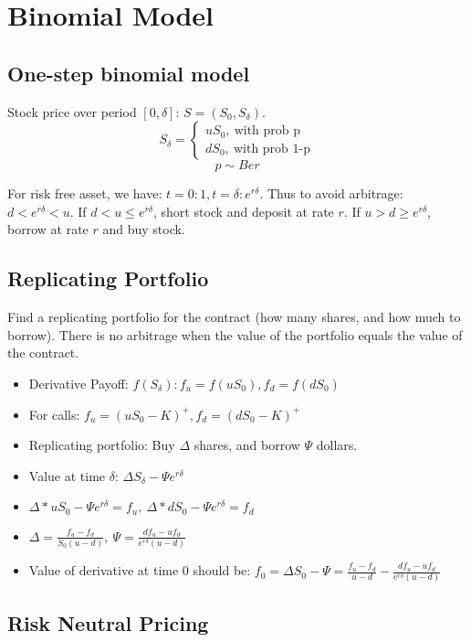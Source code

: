 \documentclass{article}
\begin{document}
\section*{Binomial Model}

\subsection*{One-step binomial model}

Stock price over period $\left[0, \delta \right]$: $S = (S_0, S_{\delta})$. 
$$S_{\delta} = \begin{cases} uS_0, \ \text{with prob p} \\ dS_0, \ \text{with prob 1-p} \end{cases}$$
$$p \sim Ber$$

For risk free asset, we have: $t=0: 1, t =  \delta : e^{r\delta}$. Thus to avoid arbitrage: $d < e^{r\delta} < u$. If $d < u \leq e^{r\delta}$, short stock and deposit at rate $r$. If $u > d \geq e^{r\delta}$, borrow at rate $r$ and buy stock. 


\subsection*{Replicating Portfolio}

Find a replicating portfolio for the contract (how many shares, and how much to borrow). There is no arbitrage when the value of the portfolio equals the value of the contract. 
\begin{itemize}
	\item Derivative Payoff: $f(S_{\delta}): f_u = f(uS_0), f_d = f(dS_0)$
	\item For calls: $f_u = (uS_0 - K)^+, f_d = (dS_0 - K)^+$
	\item Replicating portfolio: Buy $\Delta$ shares, and borrow $\Psi$ dollars.
	\item Value at time $\delta$: $\Delta S_{\delta} - \Psi e^{r\delta}$
	\item $\Delta * uS_0 - \Psi e^{r\delta} = f_u, \ \Delta * dS_0 - \Psi e^{r\delta} = f_d$
	\item $\Delta = \frac{f_u - f_d}{S_0 (u-d)}, \ \Psi = \frac{df_u - uf_d}{e^{r\delta}(u-d)}$
	\item Value of derivative at time 0 should be: $f_0 = \Delta S_0 - \Psi = \frac{f_u - f_d}{u-d} - \frac{df_u-uf_d}{e^{r\delta}(u-d)}$
\end{itemize}

\subsection*{Risk Neutral Pricing}
\end{document}
